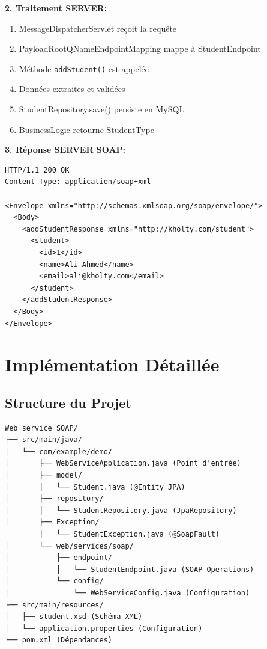 \documentclass[12pt,a4paper]{report}
\begin{document}
\textbf{2. Traitement SERVER:}
\begin{enumerate}
    \item MessageDispatcherServlet reçoit la requête
    \item PayloadRootQNameEndpointMapping mappe à StudentEndpoint
    \item Méthode \texttt{addStudent()} est appelée
    \item Données extraites et validées
    \item StudentRepository.save() persiste en MySQL
    \item BusinessLogic retourne StudentType
\end{enumerate}

\textbf{3. Réponse SERVER SOAP:}
\begin{lstlisting}
HTTP/1.1 200 OK
Content-Type: application/soap+xml

<Envelope xmlns="http://schemas.xmlsoap.org/soap/envelope/">
  <Body>
    <addStudentResponse xmlns="http://kholty.com/student">
      <student>
        <id>1</id>
        <name>Ali Ahmed</name>
        <email>ali@kholty.com</email>
      </student>
    </addStudentResponse>
  </Body>
</Envelope>
\end{lstlisting}

\newpage

\chapter{Implémentation Détaillée}

\section{Structure du Projet}

\begin{verbatim}
Web_service_SOAP/
├── src/main/java/
│   └── com/example/demo/
│       ├── WebServiceApplication.java (Point d'entrée)
│       ├── model/
│       │   └── Student.java (@Entity JPA)
│       ├── repository/
│       │   └── StudentRepository.java (JpaRepository)
│       ├── Exception/
        │   └── StudentException.java (@SoapFault)
│       └── web/services/soap/
│           ├── endpoint/
│           │   └── StudentEndpoint.java (SOAP Operations)
│           └── config/
│               └── WebServiceConfig.java (Configuration)
├── src/main/resources/
│   ├── student.xsd (Schéma XML)
│   └── application.properties (Configuration)
└── pom.xml (Dépendances)
\end{verbatim}
\end{document}
